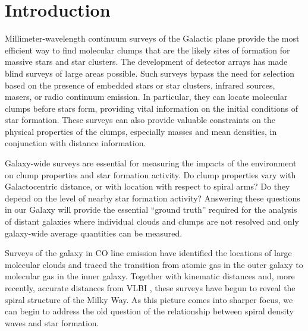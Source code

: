 \documentclass{emulateapj}
\begin{document}

%

\section{Introduction}
\label{sec:Introduction}

Millimeter-wavelength continuum surveys of the Galactic plane provide
the most efficient way to find molecular clumps that are the likely
sites of formation for massive stars and star clusters. The
development of detector arrays has made blind surveys of large areas
possible.  Such surveys bypass the need for selection based on the
presence of embedded stars or star clusters, infrared sources, masers,
or radio continuum emission. In particular, they can locate molecular
clumps before stars form, providing vital information on the initial
conditions of star formation.  These surveys can also provide valuable
constraints on the physical properties of the clumps, especially
masses and mean densities, in conjunction with distance information.

Galaxy-wide surveys are essential for measuring the impacts of the
environment on clump properties and star formation activity.  Do clump
properties vary with Galactocentric distance, or with location with
respect to spiral arms?  Do they depend on the level of nearby star
formation activity?  Answering these questions in our Galaxy will
provide the essential ``ground truth'' required for the analysis of
distant galaxies where individual clouds and clumps are not resolved
and only galaxy-wide average quantities can be measured.

Surveys of the galaxy in CO line emission \citep{dame01,jackson06}
have identified the locations of large molecular clouds and traced the
transition from atomic gas in the outer galaxy to molecular gas in the
inner galaxy.  Together with kinematic distances
\citep[e.g.][]{RotationCurve} and, more recently, accurate distances
from VLBI \citep{reid09}, these surveys have begun to reveal the
spiral structure of the Milky Way. As this picture comes into sharper
focus, we can begin to address the old question of the relationship
between spiral density waves and star formation.
\end{document}
